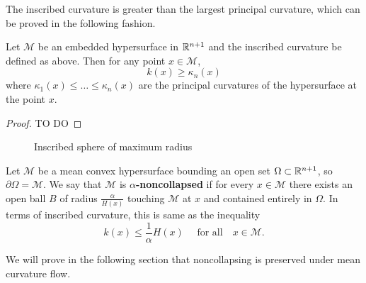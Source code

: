 The inscribed curvature is greater than the largest principal curvature, which can be proved in the following fashion. 
\begin{lemma}
    Let $ \mathcal{M} $ be an embedded hypersurface in $ \mathbb{R}^{n+1} $ and the inscribed curvature be defined as above. Then for any point $ x \in \mathcal{M} $,
    \[ k(x) \ge \kappa_{n}(x) \]
    where $ \kappa_{1}(x) \le \ldots \le \kappa_{n}(x) $ are the principal curvatures of the hypersurface at the point $ x  $.
\end{lemma}
\begin{proof}
    TO DO
\end{proof}
\begin{figure}[h]
    \centering
    \caption{Inscribed sphere of maximum radius}
\end{figure}

\begin{defn}
    Let $ \mathcal{M} $ be a mean convex hypersurface bounding an open set $ \Omega \subset \mathbb{R}^{n+1}$, so $ \partial \Omega = \mathcal{M} $. We say that $ \mathcal{M} $ is \textbf{$ \alpha $-noncollapsed}  if for every $ x \in \mathcal{M} $ there exists an open ball $ B $ of radius $ \frac{\alpha}{H(x)} $ touching $ \mathcal{M} $ at $ x $ and contained entirely in $ \Omega $. In terms of inscribed curvature, this is same as the inequality \begin{equation}
        k(x) \le \frac{1}{\alpha} H(x) \quad \text{ for all} \quad x \in \mathcal{M}.
    \end{equation}
\end{defn}
We will prove in the following section that noncollapsing is preserved under mean curvature flow.
